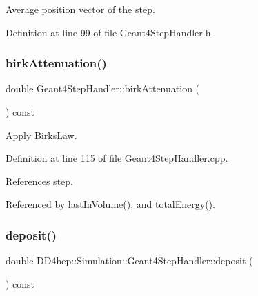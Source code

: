 Average position vector of the step. 



Definition at line 99 of file Geant4\+Step\+Handler.\+h.

\hypertarget{class_d_d4hep_1_1_simulation_1_1_geant4_step_handler_af07e4f457781ff9350953c89e986fb9e}{}\label{class_d_d4hep_1_1_simulation_1_1_geant4_step_handler_af07e4f457781ff9350953c89e986fb9e} 
\subsubsection{\texorpdfstring{birk\+Attenuation()}{birkAttenuation()}}
{\footnotesize\ttfamily double Geant4\+Step\+Handler\+::birk\+Attenuation (\begin{DoxyParamCaption}{ }\end{DoxyParamCaption}) const}



Apply Birks\+Law. 



Definition at line 115 of file Geant4\+Step\+Handler.\+cpp.



References step.



Referenced by last\+In\+Volume(), and total\+Energy().

\hypertarget{class_d_d4hep_1_1_simulation_1_1_geant4_step_handler_af06796925f270fe69057201b9b815657}{}\label{class_d_d4hep_1_1_simulation_1_1_geant4_step_handler_af06796925f270fe69057201b9b815657} 
\subsubsection{\texorpdfstring{deposit()}{deposit()}}
{\footnotesize\ttfamily double D\+D4hep\+::\+Simulation\+::\+Geant4\+Step\+Handler\+::deposit (\begin{DoxyParamCaption}{ }\end{DoxyParamCaption}) const\hspace{0.3cm}{\ttfamily [inline]}}



